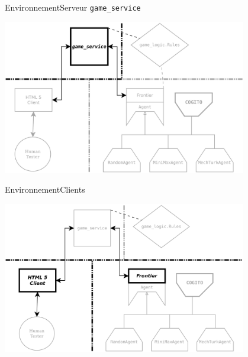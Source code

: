 \begin{frame}{Environnement}{Serveur \texttt{game\_service}}
\begin{center}
\includegraphics[width=0.8\textwidth]{img/william/archi_server}\\
\end{center}
\end{frame}
\begin{frame}{Environnement}{Clients}
\begin{center}
\includegraphics[width=0.8\textwidth]{img/william/archi_clients}\\
\end{center}
\end{frame}
